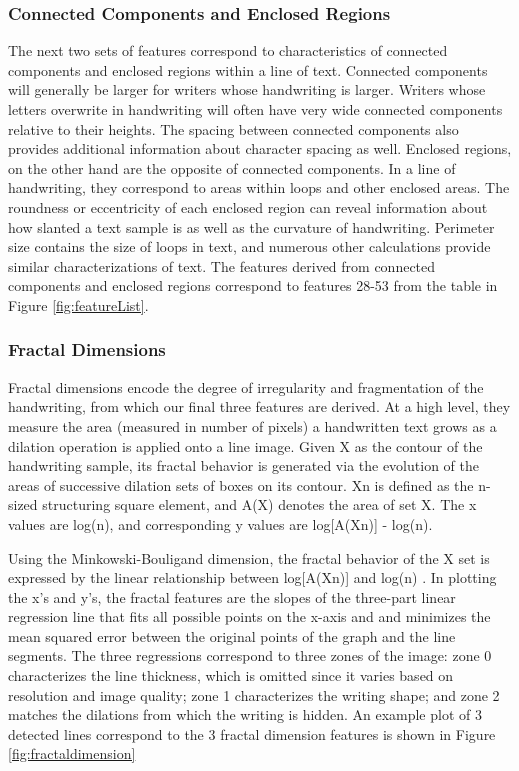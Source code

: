 \documentclass[paper=a4, fontsize=11pt]{scrartcl} %
\numberwithin{equation}{section} %
\numberwithin{figure}{section} %
\numberwithin{table}{section} %
\begin{document}
\subsubsection{Connected Components and Enclosed Regions}
The next two sets of features correspond to characteristics of
connected components and enclosed regions within a line of
text. Connected components will generally be larger for writers whose
handwriting is larger. Writers whose letters overwrite in handwriting
will often have very wide connected components relative to their
heights. The spacing between connected components also provides
additional information about character spacing as well. Enclosed
regions, on the other hand are the opposite of connected
components. In a line of handwriting, they correspond to areas within
loops and other enclosed areas. The roundness or eccentricity of each
enclosed region can reveal information about how slanted a text sample
is as well as the curvature of handwriting. Perimeter size contains
the size of loops in text, and numerous other calculations provide
similar characterizations of text. The features derived from connected
components and enclosed regions correspond to features 28-53 from the
table in Figure \ref{fig:featureList}.

\subsubsection{Fractal Dimensions}
Fractal dimensions encode the degree of irregularity and fragmentation
of the handwriting, from which our final three features are
derived\cite{FractalDimensions}. At a high level, they measure the
area (measured in number of pixels) a handwritten text grows as a
dilation operation is applied onto a line image. Given X as the
contour of the handwriting sample, its fractal behavior is generated
via the evolution of the areas of successive dilation sets of boxes on
its contour. Xn is defined as the n-sized structuring square element,
and A(X) denotes the area of set X. The x values are log(n), and
corresponding y values are log[A(Xn)] - log(n).

Using the Minkowski-Bouligand dimension, the fractal behavior of the X
set is expressed by the linear relationship between log[A(Xn)] and
log(n) \cite{SyntheticParameters}. In plotting the x's and y's, the
fractal features are the slopes of the three-part linear regression
line that fits all possible points on the x-axis and and minimizes the
mean squared error between the original points of the graph and the
line segments\cite{GeometricalFeatures}.  The three regressions
correspond to three zones of the image: zone 0 characterizes the line
thickness, which is omitted since it varies based on resolution and
image quality; zone 1 characterizes the writing shape; and zone 2
matches the dilations from which the writing is hidden. An example
plot of 3 detected lines correspond to the 3 fractal dimension
features is shown in Figure \ref{fig:fractaldimension}
\end{document}
